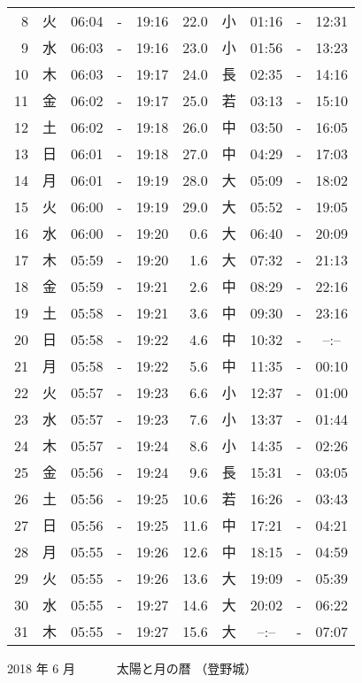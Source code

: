 \documentclass[a4j,10pt]{jsarticle}
\begin{document}
\begin{center}
\begin{table}[ht]
\begin{center}
\begin{tabular}{|rc|ccc|rc|ccc|}
  8 & 火 & 06:04 &-& 19:16 & 22.0 & 小 & 01:16 &-& 12:31 \\
  9 & 水 & 06:03 &-& 19:16 & 23.0 & 小 & 01:56 &-& 13:23 \\
 10 & 木 & 06:03 &-& 19:17 & 24.0 & 長 & 02:35 &-& 14:16 \\
 11 & 金 & 06:02 &-& 19:17 & 25.0 & 若 & 03:13 &-& 15:10 \\
 12 & 土 & 06:02 &-& 19:18 & 26.0 & 中 & 03:50 &-& 16:05 \\
 13 & 日 & 06:01 &-& 19:18 & 27.0 & 中 & 04:29 &-& 17:03 \\
 14 & 月 & 06:01 &-& 19:19 & 28.0 & 大 & 05:09 &-& 18:02 \\
 15 & 火 & 06:00 &-& 19:19 & 29.0 & 大 & 05:52 &-& 19:05 \\
 16 & 水 & 06:00 &-& 19:20 &  0.6 & 大 & 06:40 &-& 20:09 \\
 17 & 木 & 05:59 &-& 19:20 &  1.6 & 大 & 07:32 &-& 21:13 \\
 18 & 金 & 05:59 &-& 19:21 &  2.6 & 中 & 08:29 &-& 22:16 \\
 19 & 土 & 05:58 &-& 19:21 &  3.6 & 中 & 09:30 &-& 23:16 \\
 20 & 日 & 05:58 &-& 19:22 &  4.6 & 中 & 10:32 &-& --:-- \\
 21 & 月 & 05:58 &-& 19:22 &  5.6 & 中 & 11:35 &-& 00:10 \\
 22 & 火 & 05:57 &-& 19:23 &  6.6 & 小 & 12:37 &-& 01:00 \\
 23 & 水 & 05:57 &-& 19:23 &  7.6 & 小 & 13:37 &-& 01:44 \\
 24 & 木 & 05:57 &-& 19:24 &  8.6 & 小 & 14:35 &-& 02:26 \\
 25 & 金 & 05:56 &-& 19:24 &  9.6 & 長 & 15:31 &-& 03:05 \\
 26 & 土 & 05:56 &-& 19:25 & 10.6 & 若 & 16:26 &-& 03:43 \\
 27 & 日 & 05:56 &-& 19:25 & 11.6 & 中 & 17:21 &-& 04:21 \\
 28 & 月 & 05:55 &-& 19:26 & 12.6 & 中 & 18:15 &-& 04:59 \\
 29 & 火 & 05:55 &-& 19:26 & 13.6 & 大 & 19:09 &-& 05:39 \\
 30 & 水 & 05:55 &-& 19:27 & 14.6 & 大 & 20:02 &-& 06:22 \\
 31 & 木 & 05:55 &-& 19:27 & 15.6 & 大 & --:-- &-& 07:07 \\
\hline
\end{tabular}
\end{center}
\end{table}
\newpage
{\large 2018 年  6 月}
{\Large 　　　太陽と月の暦   （登野城） }

\end{center}
\end{document}
